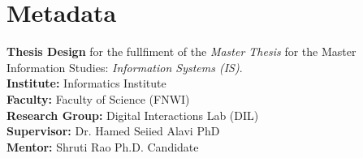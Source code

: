 \section*{Metadata}

\textbf{Thesis Design} for the fullfiment of the \emph{Master Thesis} for the Master Information Studies: \emph{Information Systems (IS)}. \\

{\parindent0pt \textbf{Institute:} Informatics Institute} \\
\textbf{Faculty:} Faculty of Science (FNWI) \\
\textbf{Research Group:} Digital Interactions Lab (DIL) \\
\textbf{Supervisor:} Dr. Hamed Seiied Alavi PhD \\
\textbf{Mentor:} Shruti Rao Ph.D. Candidate \\
